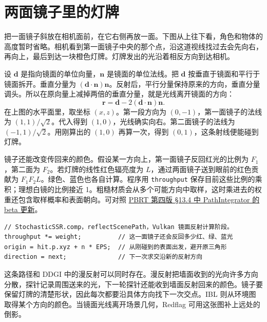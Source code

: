 \clearpage
\section{两面镜子里的灯牌}

把一面镜子斜放在相机面前，在它右侧再放一面。下图从上往下看，角色和物体的高度暂时省略。相机看到第一面镜子中央的那个点，沿这道视线找过去会先向右，再向上，最后到达一块橙色灯牌。灯牌发出的光沿着相反方向到达相机。

\begin{center}
\end{center}

设 $\mathbf d$ 是指向镜面的单位向量，$\mathbf n$ 是镜面的单位法线。把 $\mathbf d$ 按垂直于镜面和平行于镜面拆开。垂直分量为 $(\mathbf d\cdot\mathbf n)\mathbf n$。反射后，平行分量保持原来的方向，垂直分量调头。所以在原向量上减掉两倍的垂直分量，就是光线离开镜面的方向：
\[
    \mathbf r=\mathbf d-2(\mathbf d\cdot\mathbf n)\mathbf n .
\]
在上图的水平面里，取坐标 $(x,z)$。第一段方向为 $(0,-1)$，第一面镜子的法线为 $(1,1)/\sqrt{2}$。代入得到 $(1,0)$，光线确实向右。第二面镜子的法线为 $(-1,1)/\sqrt{2}$。用刚算出的 $(1,0)$ 再算一次，得到 $(0,1)$，这条射线便能碰到灯牌。

镜子还能改变传回来的颜色。假设某一方向上，第一面镜子反回红光的比例为 $F_1$，第二面为 $F_2$。若灯牌的线性红色辐亮度为 $L$，通过两面镜子送到眼前的红色贡献为 $F_1 F_2 L$。绿色、蓝色也各自计算。程序用 \texttt{throughput} 保存目前这些比例的乘积；理想白镜的比例接近 1。粗糙材质会从多个可能方向中取样，这时乘进去的权重还包含取样概率和表面朝向。可对照 \href{https://pbr-book.org/4ed/Light_Transport_I_Surface_Reflection/A_Better_Path_Tracer}{PBRT 第四版 §13.4 中 PathIntegrator 的 beta 更新}。

\begin{verbatim}
// StochasticSSR.comp，reflectScenePath，Vulkan 镜面反射计算阶段。
throughput *= weight;          // 这一面镜子还会反回多少红、绿、蓝光
origin = hit.p.xyz + n * EPS;  // 从刚碰到的表面出发，避开原三角形
direction = next;              // 下一次求交沿新的反射方向
\end{verbatim}

这条路径和 DDGI 中的漫反射可以同时存在。漫反射把墙面收到的光向许多方向分散，探针记录周围送来的光，下一轮探针还能收到墙面反射回来的颜色。镜子要保留灯牌的清楚形状，因此每次都要沿具体方向找下一次交点。IBL 则从环境图取得某个方向的颜色。当镜面光线离开场景几何，Redflag 可用这张图补上远处的倒影。
